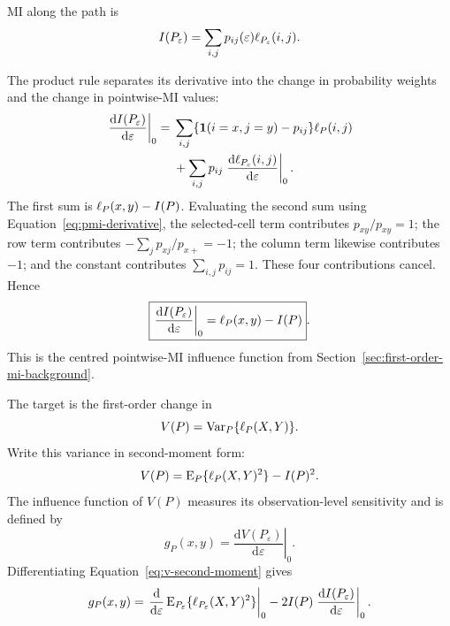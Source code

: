 MI along the path is
\begin{equation}
  I(P_\varepsilon)
  =\sum_{i,j}p_{ij}(\varepsilon)
  \ell_{P_\varepsilon}(i,j).
\end{equation}

The product rule separates its derivative into the change in probability
weights and the change in pointwise-MI values:
\begin{align}
  \left.\frac{\mathrm d I(P_\varepsilon)}{\mathrm d\varepsilon}
  \right|_{0}
  ={}&
  \sum_{i,j}
  \{\mathbf 1(i=x,j=y)-p_{ij}\}\ell_P(i,j)
  \notag\\
  &+
  \sum_{i,j}p_{ij}
  \left.\frac{\mathrm d\ell_{P_\varepsilon}(i,j)}
  {\mathrm d\varepsilon}\right|_{0}.
\end{align}
The first sum is \(\ell_P(x,y)-I(P)\). Evaluating the second sum using
Equation~\eqref{eq:pmi-derivative}, the selected-cell term contributes
\(p_{xy}/p_{xy}=1\); the row term contributes
\(-\sum_j p_{xj}/p_{x+}=-1\); the column term likewise contributes \(-1\);
and the constant contributes \(\sum_{i,j}p_{ij}=1\). These four
contributions cancel. Hence
\begin{equation}
  \boxed{
  \left.\frac{\mathrm d I(P_\varepsilon)}{\mathrm d\varepsilon}
  \right|_{0}
  =\ell_P(x,y)-I(P)
  }.
  \label{eq:mi-derivative}
\end{equation}
This is the centred pointwise-MI influence function from
Section~\ref{sec:first-order-mi-background}.

\medskip
{}

The target is the first-order change in
\begin{equation}
  V(P)
  =\operatorname{Var}_P\{\ell_P(X,Y)\}.
\end{equation}
Write this variance in second-moment form:
\begin{equation}
  V(P)=\operatorname{E}_P\{\ell_P(X,Y)^2\}-I(P)^2.
  \label{eq:v-second-moment}
\end{equation}
The influence function of \(V(P)\) measures its observation-level
sensitivity and is defined by
\begin{equation}
  g_P(x,y)
  =
  \left.
  \frac{\mathrm d V(P_\varepsilon)}{\mathrm d\varepsilon}
  \right|_{0}.
  \label{eq:g-definition}
\end{equation}
Differentiating Equation~\eqref{eq:v-second-moment} gives
\begin{equation}
  g_P(x,y)
  =
  \left.\frac{\mathrm d}{\mathrm d\varepsilon}
  \operatorname{E}_{P_\varepsilon}\{\ell_{P_\varepsilon}(X,Y)^2\}
  \right|_{0}
  -2I(P)
  \left.\frac{\mathrm d I(P_\varepsilon)}{\mathrm d\varepsilon}
  \right|_{0}.
  \label{eq:g-decomposition}
\end{equation}

